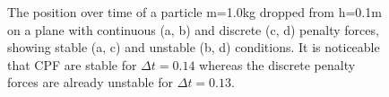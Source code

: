 \begin{figure}[h!]
		\begin{minipage}[b]{0.5 \linewidth}
			\centering
		\end{minipage}
		\begin{minipage}[b]{0.5 \linewidth}
			\centering
		\end{minipage}	
\caption[The position over time of a particle m=1.0kg  dropped from h=0.1m on a plane with continuous (a, b) and discrete (c, d) penalty forces]{The position over time of a particle m=1.0kg  dropped from h=0.1m on a plane with continuous (a, b) and discrete (c, d) penalty forces, showing stable (a, c) and unstable (b, d) conditions. It is noticeable that CPF are stable for $\Delta t=0.14$ whereas the discrete penalty forces are already unstable for $\Delta t=0.13$.}
\label{fig::particle_multdt}
\end{figure}

